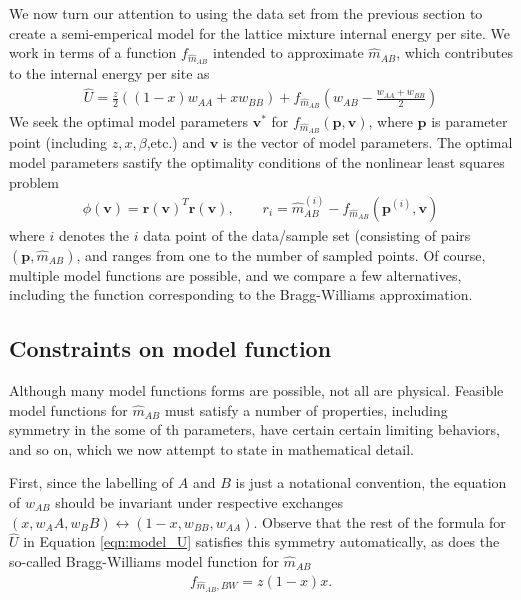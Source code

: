 \documentclass[10pt]{article}
\begin{document}
We now turn our attention to using the data set from the previous section to create a semi-emperical model for the lattice mixture internal energy per site.
We work in terms of a function $f_{\hat{m}_{AB}}$ intended to approximate $\hat{m}_{AB}$, which contributes to the internal energy per site as
\begin{align}
    \hat{U} = \frac{z}{2} \left( (1-x) w_{AA} + x w_{BB} \right) +
    f_{\hat{m}_{AB}} \left( w_{AB} - \frac{w_{AA} + w_{BB}}{2} \right)
    \label{eqn:model_U}
\end{align}
We seek the optimal model parameters $\mathbf{v}^*$ for $f_{\hat{m}_{AB}}(\mathbf{p},\mathbf{v})$, where $\mathbf{p}$ is  parameter point (including $z,x,\beta$,etc.) and $\mathbf{v}$ is the vector of model parameters.
The optimal model parameters sastify the optimality conditions of the nonlinear least squares problem
\begin{align}
\phi(\mathbf{v}) = \mathbf{r}(\mathbf{v})^T \mathbf{r}(\mathbf{v}),
\quad\quad r_i = \hat{m}_{AB}^{(i)} - f_{\hat{m}_{AB}}(\mathbf{p}^{(i)},\mathbf{v})
\end{align}
where $i$ denotes the $i$ data point of the data/sample set (consisting of pairs $(\mathbf{p},\hat{m}_{AB})$, and ranges from one to the number of sampled points.
Of course, multiple model functions are possible, and we compare a few alternatives, including the function corresponding to the Bragg-Williams approximation.

\subsection{Constraints on model function}
Although many model functions forms are possible, not all are physical.
Feasible model functions for $\hat{m}_{AB}$ must satisfy a number of properties, including symmetry in the some of th parameters, have certain certain limiting behaviors, and so on, which we now attempt to state in mathematical detail.

First, since the labelling of $A$ and $B$ is just a notational convention, the equation of $w_{AB}$ should be invariant under respective exchanges $(x,w_AA,w_BB) \longleftrightarrow (1-x,w_{BB},w_{AA})$.
Observe that the rest of the formula for $\hat{U}$ in Equation \ref{eqn:model_U} satisfies this symmetry automatically, as does the so-called Bragg-Williams model function for $\hat{m}_{AB}$
\begin{align}
    f_{\hat{m}_{AB},BW} = z (1-x) x.
    \label{eqn:BW_model_function}
\end{align}
\end{document}

